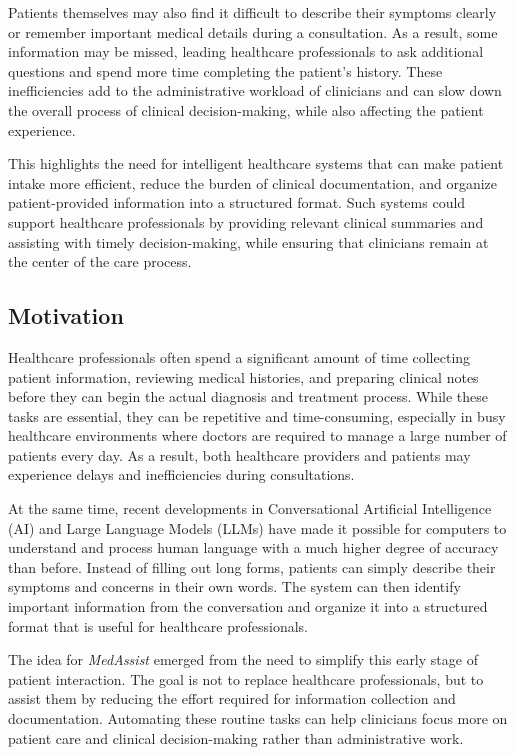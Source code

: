 \documentclass[conference]{IEEEtran}
\begin{document}
Patients themselves may also find it difficult to describe their symptoms clearly or remember important medical details during a consultation. As a result, some information may be missed, leading healthcare professionals to ask additional questions and spend more time completing the patient's history. These inefficiencies add to the administrative workload of clinicians and can slow down the overall process of clinical decision-making, while also affecting the patient experience.

This highlights the need for intelligent healthcare systems that can make patient intake more efficient, reduce the burden of clinical documentation, and organize patient-provided information into a structured format. Such systems could support healthcare professionals by providing relevant clinical summaries and assisting with timely decision-making, while ensuring that clinicians remain at the center of the care process.

\subsection{Motivation}

Healthcare professionals often spend a significant amount of time collecting patient information, reviewing medical histories, and preparing clinical notes before they can begin the actual diagnosis and treatment process. While these tasks are essential, they can be repetitive and time-consuming, especially in busy healthcare environments where doctors are required to manage a large number of patients every day. As a result, both healthcare providers and patients may experience delays and inefficiencies during consultations.

At the same time, recent developments in Conversational Artificial Intelligence (AI) and Large Language Models (LLMs) have made it possible for computers to understand and process human language with a much higher degree of accuracy than before. Instead of filling out long forms, patients can simply describe their symptoms and concerns in their own words. The system can then identify important information from the conversation and organize it into a structured format that is useful for healthcare professionals.

The idea for \textit{MedAssist} emerged from the need to simplify this early stage of patient interaction. The goal is not to replace healthcare professionals, but to assist them by reducing the effort required for information collection and documentation. Automating these routine tasks can help clinicians focus more on patient care and clinical decision-making rather than administrative work.
\end{document}
